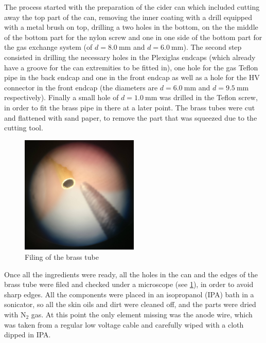 The process started with the preparation of the cider can which included cutting
away the top part of the can, removing the inner coating with a drill equipped with a
metal brush on top, drilling a two holes in the bottom, on the the middle of the
bottom part for the nylon screw and one in one side of the bottom part for the
gas exchange system (of $d = \SI{8.0}{\milli\meter}$ and $d =
\SI{6.0}{\milli\meter}$). The second step consisted in drilling the necessary
holes in the Plexiglas endcaps (which already have a groove for the can
extremities to be fitted in), one hole for the gas Teflon pipe in the back
endcap and one in the front endcap as well as a hole for the HV connector in the
front endcap (the diameters are $d = \SI{6.0}{\milli\meter}$ and $d =
\SI{9.5}{\milli\meter}$ respectively). Finally a small hole of $d =
\SI{1.0}{\milli\meter}$ was drilled in the Teflon screw, in order to fit the
brass pipe in there at a later point. The brass tubes were cut and flattened
with sand paper, to remove the part that was squeezed due to the cutting tool.

\begin{figure}[htb!]
  \centering
  \includegraphics[width=0.5\textwidth]{./graphics/brass_file.jpg}
  \caption{Filing of the brass tube}
  \label{fig:brass_file}
\end{figure}


Once all the ingredients were ready, all the holes in the can and the edges of
the brass tube were filed and checked under a microscope (see \ref{fig:brass_file}), in order to avoid
sharp edges. All the components were placed in an isopropanol (IPA) bath in a
sonicator, so all the skin oils and dirt were cleaned off, and the parts were
dried with $\mathrm{N}_2$ gas. At this point the only element missing was the
anode wire, which was taken from a regular low voltage cable and carefully wiped
with a cloth dipped in IPA.


